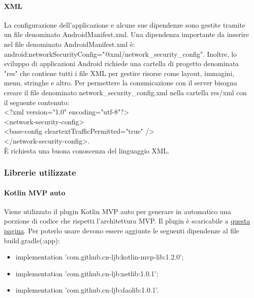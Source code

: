 \paragraph{XML}
La configurazione dell'applicazione e alcune sue dipendenze sono gestite tramite un file denominato AndroidManifest.xml. Una dipendenza importante da inserire nel file denominato AndroidManifest.xml è: android:networkSecurityConfig="@xml/network\_security\_config".  Inoltre, lo sviluppo di applicazioni Android richiede una cartella di progetto denominata "res" che contiene tutti i file XML per gestire risorse come layout, immagini, menu, stringhe e altro. 
Per permettere la comunicazione con il server bisogna creare il file denominato network\_security\_config.xml nella cartella res/xml con il seguente contenuto:\\ <?xml version="1.0" encoding="utf-8"?>\\
<network-security-config>\\
<base-config cleartextTrafficPermitted="true" />\\
</network-security-config>.\\
È richiesta una buona conoscenza del linguaggio XML.

\subsubsection{Librerie utilizzate}

\paragraph{Kotlin MVP auto}
Viene utilizzato il plugin Kotlin MVP auto per generare in automatico una porzione di codice che rispetti l'architettura MVP. Il plugin è scaricabile a \href{https://plugins.jetbrains.com/plugin/12265-kotlin-mvp-auto}{questa pagina}.
Per poterlo usare devono essere aggiunte le seguenti dipendenze al file build.gradle(:app):\\
\begin{itemize}
	\item implementation 'com.github.cn-ljb:kotlin-mvp-lib:1.2.0'; \\
	\item implementation 'com.github.cn-ljb:netlib:1.0.1'; \\
	\item implementation 'com.github.cn-ljb:daolib:1.0.1'. \\
\end{itemize}

